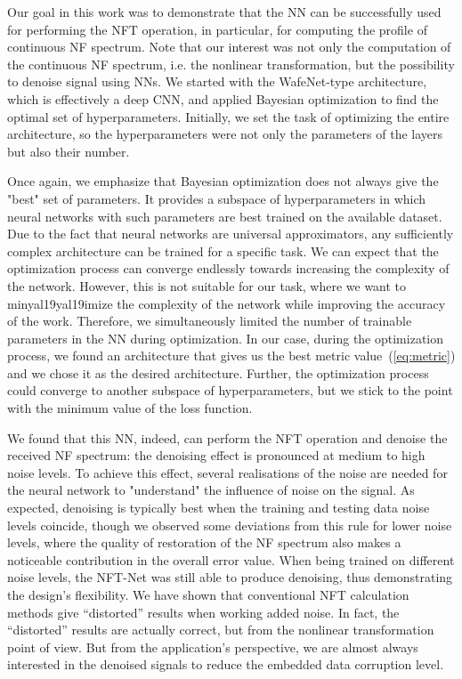 Our goal in this work was to demonstrate that the NN can be successfully used for performing the NFT operation, in particular, for computing the profile of continuous NF spectrum. 
Note that our interest was not only the computation of the continuous NF spectrum, i.e. the nonlinear transformation, but the possibility to denoise signal using NNs. 
We started with the WafeNet-type architecture\cite{od2016wavenet}, which is effectively a deep CNN, and applied Bayesian optimization \cite{freire2020complex} to find the optimal set of hyperparameters.
Initially, we set the task of optimizing the entire architecture, so the hyperparameters were not only the parameters of the layers but also their number.

Once again, we emphasize that Bayesian optimization does not always give the "best" set of parameters.
It provides a subspace of hyperparameters in which neural networks with such parameters are best trained on the available dataset.
Due to the fact that neural networks are universal approximators, any sufficiently complex architecture can be trained for a specific task.
We can expect that the optimization process can converge endlessly towards increasing the complexity of the network.
However, this is not suitable for our task, where we want to minyal19yal19imize the complexity of the network while improving the accuracy of the work. 
Therefore, we simultaneously limited the number of trainable parameters in the NN during optimization.
In our case, during the optimization process, we found an architecture that gives us the best metric value~(\ref{eq:metric}) and we chose it as the desired architecture. Further, the optimization process could converge to another subspace of hyperparameters, but we stick to the point with the minimum value of the loss function.

We found that this NN, indeed, can perform the NFT operation and denoise the received NF spectrum: the denoising effect is pronounced at medium to high noise levels. 
To achieve this effect, several realisations of the noise are needed for the neural network to "understand" the influence of noise on the signal. 
As expected, denoising is typically best when the training and testing data noise levels coincide, though we observed some deviations from this rule for lower noise levels, where the quality of restoration of the NF spectrum also makes a noticeable contribution in the overall error value. When being trained on different noise levels, the NFT-Net was still able to produce denoising, thus demonstrating the design's flexibility. We have shown that conventional NFT calculation methods give ``distorted'' results when working added noise. In fact, the ``distorted'' results are actually correct, but from the nonlinear transformation point of view. But from the application's perspective, we are almost always interested in the denoised signals to reduce the embedded data corruption level.

